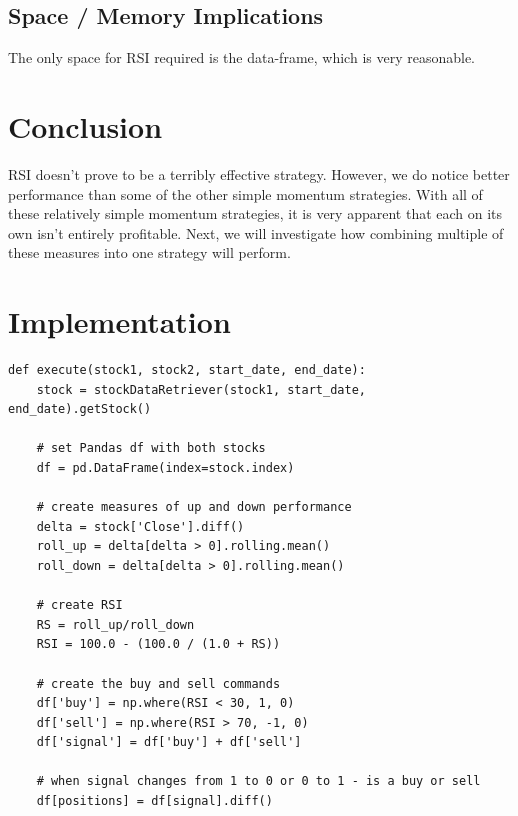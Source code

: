 \documentclass[letterpaper,11pt]{article}
\begin{document}
\subsection*{Space / Memory Implications}
The only space for  RSI required is the data-frame, which is very reasonable.

\section*{Conclusion}
RSI doesn't prove to be a terribly effective strategy. However, we do notice better performance than some of the other simple momentum strategies. With all of these relatively simple momentum strategies, it is very apparent that each on its own isn't entirely profitable. Next, we will investigate how combining multiple of these measures into one strategy will perform.

\section*{Implementation}
\begin{verbatim}
def execute(stock1, stock2, start_date, end_date):
    stock = stockDataRetriever(stock1, start_date, end_date).getStock()

    # set Pandas df with both stocks
    df = pd.DataFrame(index=stock.index)

    # create measures of up and down performance
    delta = stock['Close'].diff()
    roll_up = delta[delta > 0].rolling.mean()
    roll_down = delta[delta > 0].rolling.mean()
    
    # create RSI
    RS = roll_up/roll_down
    RSI = 100.0 - (100.0 / (1.0 + RS))

    # create the buy and sell commands
    df['buy'] = np.where(RSI < 30, 1, 0)
    df['sell'] = np.where(RSI > 70, -1, 0)
    df['signal'] = df['buy'] + df['sell']

    # when signal changes from 1 to 0 or 0 to 1 - is a buy or sell
    df[positions] = df[signal].diff()

\end{verbatim}



\end{document}
